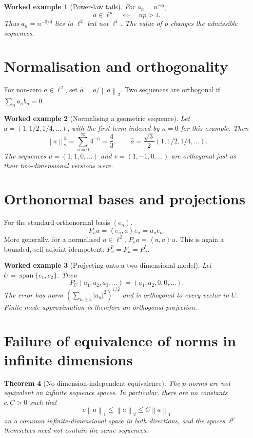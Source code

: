 \documentclass[11pt,a5paper,oneside,openany]{scrreprt}
\theoremstyle{notes}
\newtheorem{theorem}{Theorem}[section]
\theoremstyle{definitions}
\newtheorem{example}[theorem]{Worked example}
\newcommand{\ip}[2]{\left\langle #1,#2\right\rangle}
\newcommand{\norm}[1]{\left\lVert #1\right\rVert}
\newcommand{\Span}{\operatorname{span}}
\begin{document}
\begin{example}[Power-law tails]
For $a_n=n^{-\alpha}$,
\[
 a\in\ell^p \quad\Longleftrightarrow\quad \alpha p>1.
\]
Thus $a_n=n^{-3/4}$ lies in $\ell^2$ but not $\ell^1$.  The value of $p$
changes the admissible sequences.
\end{example}

\section{Normalisation and orthogonality}

For non-zero $a\in\ell^2$, set $\widehat a=a/\norm{a}_2$.  Two sequences are
orthogonal if $\sum_na_nb_n=0$.

\begin{example}[Normalising a geometric sequence]
Let $a=(1,1/2,1/4,\ldots)$, with the first term indexed by $n=0$ for this
example.  Then
\[
 \norm{a}_2^2=\sum_{n=0}^{\infty}4^{-n}=\frac43,
 \qquad
 \widehat a=\frac{\sqrt3}{2}(1,1/2,1/4,\ldots).
\]
The sequences $u=(1,1,0,\ldots)$ and $v=(1,-1,0,\ldots)$ are orthogonal just
as their two-dimensional versions were.
\end{example}

\section{Orthonormal bases and projections}

For the standard orthonormal basis $(e_n)$,
\[
  P_na=\ip{e_n}{a}e_n=a_ne_n.
\]
More generally, for a normalised $u\in\ell^2$,
$P_ua=\ip{u}{a}u$.  This is again a bounded, self-adjoint idempotent:
$P_u^2=P_u=P_u^*$.

\begin{example}[Projecting onto a two-dimensional model]
Let $U=\Span\{e_1,e_2\}$.  Then
\[
 P_U(a_1,a_2,a_3,\ldots)=(a_1,a_2,0,0,\ldots).
\]
The error has norm $(\sum_{n\ge3}|a_n|^2)^{1/2}$ and is orthogonal to every
vector in $U$.  Finite-mode approximation is therefore an orthogonal
projection.
\end{example}

\section{Failure of equivalence of norms in infinite dimensions}

\begin{theorem}[No dimension-independent equivalence]
The $p$-norms are not equivalent on infinite sequence spaces.  In particular,
there are no constants $c,C>0$ such that
\[
 c\norm{a}_1\le\norm{a}_2\le C\norm{a}_1
\]
on a common infinite-dimensional space in both directions, and the spaces
$\ell^p$ themselves need not contain the same sequences.
\end{theorem}
\end{document}
